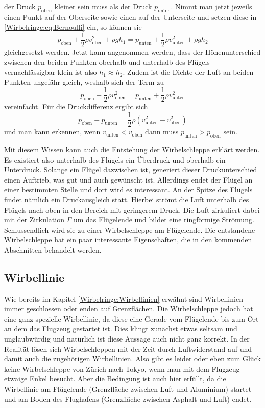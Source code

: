 der Druck $p_{\text{oben}}$ kleiner sein muss als der Druck $p_{\text{unten}}$.
Nimmt man jetzt jeweils einen Punkt auf der Oberseite sowie einen auf der Unterseite und setzen diese in \eqref{Wirbelringe:eq:Bernoulli} ein, so können sie 
\begin{equation*}
p_{\text{oben}}+\frac{1}{2}\rho v^2_{\text{oben}} + \rho gh_1 
=
p_{\text{unten}}+\frac{1}{2}\rho v^2_{\text{unten}}+\rho gh_2
\end{equation*}
gleichgesetzt werden.
Jetzt kann angenommen werden, dass der Höhenunterschied zwischen den beiden Punkten oberhalb und unterhalb des Flügels vernachlässigbar klein ist also \(h_1\approx h_2\).
Zudem ist die Dichte der Luft an beiden Punkten ungefähr gleich, weshalb sich der Term zu 
\begin{equation*}
p_{\text{oben}}+\frac{1}{2}\rho v^2_{\text{oben}} 
=
p_{\text{unten}}+\frac{1}{2}\rho v^2_{\text{unten}}
\end{equation*}
vereinfacht.
Für die Druckdifferenz ergibt sich
\begin{equation*}
p_{\text{oben}}-p_{\text{unten}} 
=
\frac{1}{2}\rho( v^2_{\text{unten}}-v^2_{\text{oben}})
\end{equation*}
und man kann erkennen, wenn $v_{\text{unten}} < v_{\text{oben}}$ dann muss $p_{\text{unten}} > p_{\text{oben}}$ sein.

Mit diesem Wissen kann auch die Entstehung der Wirbelschleppe erklärt werden. 
Es existiert also unterhalb des Flügels ein Überdruck und oberhalb ein Unterdruck.
Solange ein Flügel dazwischen ist, generiert dieser Druckunterschied einen Auftrieb, was gut und auch gewünscht ist.
Allerdings endet der Flügel an einer bestimmten Stelle und dort wird es interessant.
An der Spitze des Flügels findet nämlich ein Druckausgleich statt.
Hierbei strömt die Luft unterhalb des Flügels nach oben in den Bereich mit geringerem Druck. 
Die Luft zirkuliert dabei mit der Zirkulation $\Gamma$ um das Flügelende und bildet eine ringförmige Strömung.
Schlussendlich wird sie zu einer Wirbelschleppe am Flügelende.
Die entstandene Wirbelschleppe hat ein paar interessante Eigenschaften, die in den kommenden Abschnitten behandelt werden.

\subsection{Wirbellinie}
Wie bereits im Kapitel \ref{Wirbelringe:Wirbellinien} erwähnt sind Wirbellinien immer geschlossen oder enden auf Grenzflächen.
Die Wirbelschleppe jedoch hat eine ganz spezielle Wirbellinie, da diese eine Gerade vom Flügelende bis zum Ort an dem das Flugzeug gestartet ist.
Dies klingt zunächst etwas seltsam und unglaubwürdig und natürlich ist diese Aussage auch nicht ganz korrekt.
In der Realität lösen sich Wirbelschleppen mit der Zeit durch Luftwiderstand auf und damit auch die zugehörigen Wirbellinien.
Also gibt es leider oder eben zum Glück keine Wirbelschleppe von Zürich nach Tokyo, wenn man mit dem Flugzeug etwaige Enkel besucht.
Aber die Bedingung ist auch hier erfüllt, da die Wirbellinie am Flügelende (Grenzfläche zwischen Luft und Aluminium) startet und am Boden des Flughafens (Grenzfläche zwischen Asphalt und Luft) endet.

